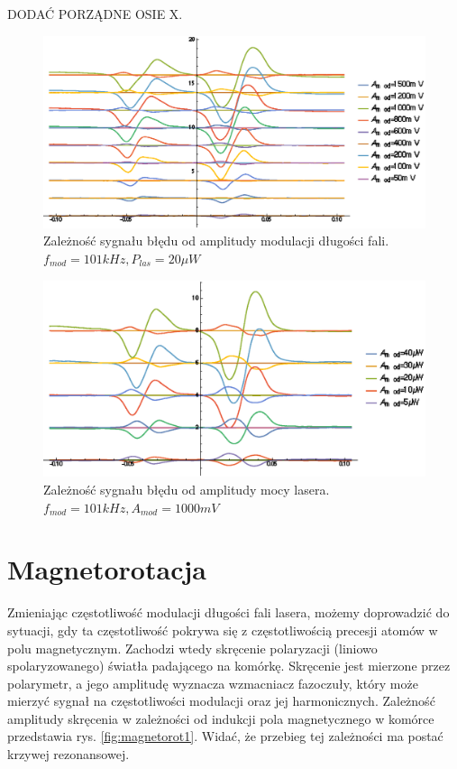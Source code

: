 \documentclass[a4paper,10pt]{article}
\begin{document}
DODAĆ PORZĄDNE OSIE X.

\begin{figure}[h!]
\centering
 \includegraphics[width=\textwidth]{panoramy_1H_oda.eps}
 \caption{Zależność sygnału błędu od amplitudy modulacji długości fali. $f_{mod}=101kHz, P_{las}=20 \mu W$}
 \label{fig:panoda}
\end{figure}

\begin{figure}[h!]
\centering
 \includegraphics[width=\textwidth]{panoramy_1H_odp.eps}
 \caption{Zależność sygnału błędu od amplitudy mocy lasera. $f_{mod}=101kHz, A_{mod}=1000mV$}
 \label{fig:panodp}
\end{figure}

\section{Magnetorotacja}

Zmieniając częstotliwość modulacji długości fali lasera, możemy doprowadzić do sytuacji, gdy ta częstotliwość pokrywa się z częstotliwością precesji atomów w polu magnetycznym.
Zachodzi wtedy skręcenie polaryzacji (liniowo spolaryzowanego) światła padającego na komórkę. Skręcenie jest mierzone przez polarymetr, a jego amplitudę wyznacza wzmacniacz fazoczuły, który może mierzyć sygnał na częstotliwości modulacji oraz jej harmonicznych. Zależność amplitudy skręcenia w zależności od indukcji pola magnetycznego w komórce przedstawia rys. \ref{fig:magnetorot1}. Widać, że przebieg tej zależności ma postać krzywej rezonansowej.
\end{document}
